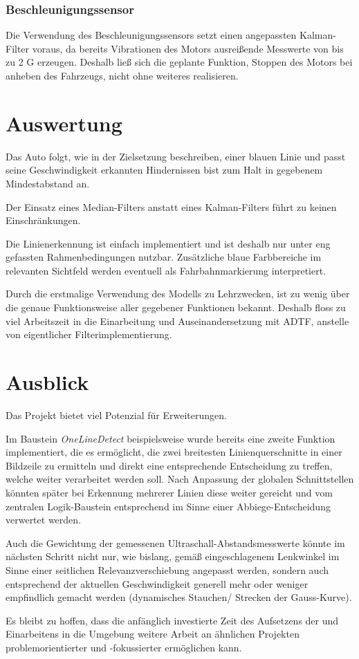 \documentclass[12pt, a4paper]{scrartcl}
\begin{document}
\subsubsection{Beschleunigungssensor}
Die Verwendung des Beschleunigungssensors setzt einen angepassten Kalman-Filter voraus, da bereits Vibrationen des Motors ausreißende Messwerte von bis zu 2 G erzeugen. Deshalb ließ sich die geplante Funktion, Stoppen des Motors bei anheben des Fahrzeugs, nicht ohne weiteres realisieren. 

\newpage
\section{Auswertung}
Das Auto folgt, wie in der Zielsetzung beschreiben, einer blauen Linie und passt seine Geschwindigkeit erkannten Hindernissen bist zum Halt in gegebenem Mindestabstand an.

Der Einsatz eines Median-Filters anstatt eines Kalman-Filters führt zu keinen Einschränkungen.

Die Linienerkennung ist einfach implementiert und ist deshalb nur unter eng gefassten Rahmenbedingungen nutzbar. Zusätzliche blaue Farbbereiche im relevanten Sichtfeld werden eventuell als Fahrbahnmarkierung interpretiert.

Durch die erstmalige Verwendung des Modells zu Lehrzwecken, ist zu wenig über die genaue Funktionsweise aller gegebener Funktionen bekannt. Deshalb floss zu viel Arbeitszeit in die Einarbeitung und Auseinandersetzung mit ADTF, anstelle von eigentlicher Filterimplementierung.

\section{Ausblick}
Das Projekt bietet viel Potenzial für Erweiterungen.

Im Baustein \emph{OneLineDetect} beispielsweise wurde bereits eine zweite Funktion implementiert, die es ermöglicht, die zwei breitesten Linienquerschnitte in einer Bildzeile zu ermitteln und direkt eine entsprechende Entscheidung zu treffen, welche weiter verarbeitet werden soll. Nach Anpassung der globalen Schnittstellen könnten später bei Erkennung mehrerer Linien diese weiter gereicht und vom zentralen Logik-Baustein entsprechend im Sinne einer Abbiege-Entscheidung verwertet werden.

Auch die Gewichtung der gemessenen Ultraschall-Abstandsmesswerte könnte im nächsten Schritt nicht nur, wie bislang, gemäß eingeschlagenem Lenkwinkel im Sinne einer seitlichen Relevanzverschiebung angepasst werden, sondern auch entsprechend der aktuellen Geschwindigkeit generell mehr oder weniger empfindlich gemacht werden (dynamisches Stauchen/ Strecken der Gauss-Kurve).

Es bleibt zu hoffen, dass die anfänglich investierte Zeit des Aufsetzens der und Einarbeitens in die Umgebung weitere Arbeit an ähnlichen Projekten problemorientierter und -fokussierter ermöglichen kann.


\newpage
{}
\listoffigures
\end{document}
